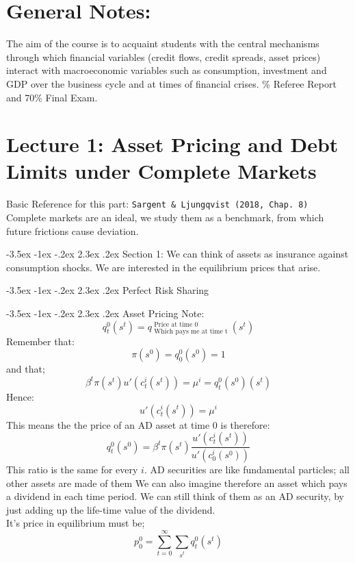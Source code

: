 \documentclass[11pt]{report}
\makeatletter
\newcommand{\bb}{\bigbreak\noindent}
\renewcommand\section{\leftskip 0pt\@startsection {section}{1}{\z@}%
	{-3.5ex \@plus -1ex \@minus -.2ex}%
	{2.3ex \@plus.2ex}%
	{\normalfont\Large\bfseries}}
\makeatother
\begin{document}
	\setcounter{page}{1}
	\begin{spacing}{1.5}
		
		\tableofcontents
		\setcounter{secnumdepth}{-2}
		\newpage
		
	\chapter{General Notes:} 
	The aim of the course is to acquaint students with the central mechanisms through which financial variables (credit flows, credit spreads, asset prices) interact with macroeconomic variables such as consumption, investment and GDP over the business cycle and at times of financial crises. 
	\bb
	30\% Referee Report and 70\% Final Exam.
		
	\chapter{Lecture 1: Asset Pricing and Debt Limits under Complete Markets}
	Basic Reference for this part: \texttt{Sargent \& Ljungqvist (2018, Chap. 8)}
	\bb
	Complete markets are an ideal, we study them as a benchmark, from which future frictions cause deviation. 
		
		\section{Section 1:}
		We can think of assets as insurance against consumption shocks. We are interested in the equilibrium prices that arise. 
		
		
		
		\section{Perfect Risk Sharing}
		
		\section{Asset Pricing}
		Note:\\
		\[ q^0_t(s^t) = q\:^{\text{Price at time 0}}_{\text{Which pays me at time t}} \:(s^t)\]
		Remember that:
		\[ \pi(s^0) = q^0_0(s^0) = 1 \]
		and that;
		\[ \beta^t \pi(s^t) u'(c^i_t(s^t)) = \mu^i =q^0_t(s^0) (s^t) \]
		Hence: 
		\[ u'(c^i_t(s^t)) = \mu^i \]
		This means the the price of an AD asset at time 0 is therefore: 
		\[ q^0_t(s^0) = \beta^t \pi(s^t) \dfrac{u'(c^i_t(s^t))}{u'(c^i_0(s^0))} \]
		This ratio is the same for every $i$. 
		\bb
		AD securities are like fundamental particles; all other assets are made of them
		\bb
		We can also imagine therefore an asset which pays a dividend in each time period.  We can still think of them as an AD security, by just adding up the life-time value of the dividend.\\
		It's price in equilibrium must be;
		\[ p^0_0 = \sum_{t=0}^{\infty} \sum_{s^t} q^0_t (s^t)\]
		

\end{spacing}
\end{document}
